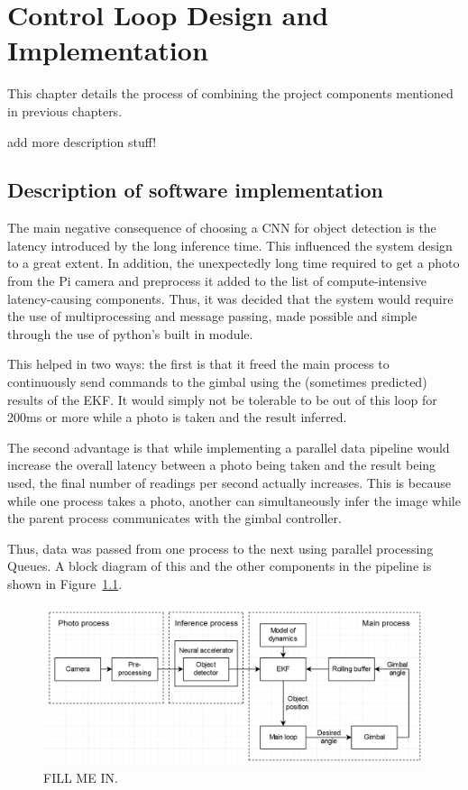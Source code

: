 \chapter{Control Loop Design and Implementation}
This chapter details the process of combining the project components mentioned in previous chapters.

{\color{red} add more description stuff!}

\section{Description of software implementation}
The main negative consequence of choosing a CNN for object detection is the latency introduced by the long inference time. This influenced the system design to a great extent. In addition, the unexpectedly long time required to get a photo from the Pi camera and preprocess it added to the list of compute-intensive latency-causing components. Thus, it was decided that the system would require the use of multiprocessing and message passing, made possible and simple through the use of python's built in  module.

This helped in two ways: the first is that it freed the main process to continuously send commands to the gimbal using the (sometimes predicted) results of the EKF. It would simply not be tolerable to be out of this loop for 200ms or more while a photo is taken and the result inferred.

The second advantage is that while implementing a parallel data pipeline would increase the overall latency between a photo being taken and the result being used, the final number of readings per second actually increases. This is because while one process takes a photo, another can simultaneously infer the image while the parent process communicates with the gimbal controller.

Thus, data was passed from one process to the next using parallel processing Queues. A block diagram of this and the other components in the pipeline is shown in Figure~\ref{fig:system_block_diagram}.

\begin{figure}[h!]
  \centering
  \includegraphics[width=\textwidth]{methodology/system_block_diagram2}
  \caption{\label{fig:system_block_diagram} FILL ME IN.}
\end{figure}


